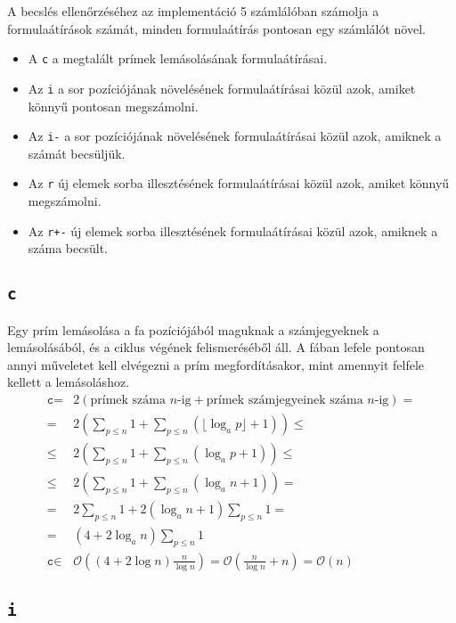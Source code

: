 \documentclass{article}
\begin{document}
A becslés ellenőrzéséhez az implementáció 5 számlálóban számolja a formulaátírások számát, minden formulaátírás pontosan egy számlálót növel.
\begin{itemize}
\item A \texttt{c} a megtalált prímek lemásolásának formulaátírásai.
\item Az \texttt{i} a sor pozíciójának növelésének formulaátírásai közül azok, amiket könnyű pontosan megszámolni.
\item Az \texttt{i-} a sor pozíciójának növelésének formulaátírásai közül azok, amiknek a számát becsüljük.
\item Az \texttt{r} új elemek sorba illesztésének formulaátírásai közül azok, amiket könnyű megszámolni.
\item Az \texttt{r+-} új elemek sorba illesztésének formulaátírásai közül azok, amiknek a száma becsült.
\end{itemize}

\subsection{\texttt{c}}

Egy prím lemásolása a fa pozíciójából maguknak a számjegyeknek a lemásolásából, és a ciklus végének felismeréséből áll.
A fában lefele pontosan annyi műveletet kell elvégezni a prím megfordításakor, mint amennyit felfele kellett a lemásoláshoz.
\begin{align*}
\texttt{c} =& 2 \left( \text{prímek száma } n \text{-ig} + \text{prímek számjegyeinek száma } n \text{-ig} \right) = \\
=& 2 \left( \sum_{p \le n}1 + \sum_{p \le n} \left( \lfloor \log_{a}{p} \rfloor + 1 \right) \right) \le \\
\le& 2 \left( \sum_{p \le n}1 + \sum_{p \le n} \left( \log_{a}{p} + 1 \right) \right) \le \\
\le& 2 \left( \sum_{p \le n}1 + \sum_{p \le n} \left( \log_{a}{n} + 1 \right) \right) = \\
=& 2 \sum_{p \le n}1 + 2 \left( \log_{a}{n} + 1 \right) \sum_{p \le n} 1 = \\
=& \left( 4 + 2 \log_{a}{n} \right) \sum_{p \le n}1 \\
\texttt{c} \in& \mathcal{O} \left( \left( 4 + 2 \log{n} \right) \frac{n}{\log{n}} \right)
= \mathcal{O} \left( \frac{n}{\log{n}} + n \right)
= \mathcal{O} \left( n \right)
\end{align*}

\subsection{\texttt{i}}
\end{document}
